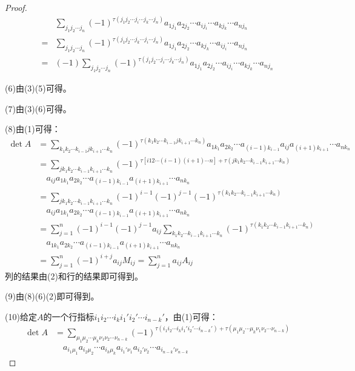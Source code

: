 \begin{proof}
\begin{align*}
		&\sum_{j_1j_2\cdots j_n}(-1)^{\tau(j_1j_2\cdots j_i\cdots j_k\cdots j_n)}a_{1j_1}a_{2j_2}\cdots a_{ij_i}\cdots a_{kj_k}\cdots a_{nj_n} \\
		=&\sum_{j_1j_2\cdots j_n}(-1)^{\tau(j_1j_2\cdots j_k\cdots j_i\cdots j_n)}a_{1j_1}a_{2j_2}\cdots a_{kj_k}\cdots a_{ij_i}\cdots a_{nj_n} \\
		=&(-1)\sum_{j_1j_2\cdots j_n}(-1)^{\tau(j_1j_2\cdots j_i\cdots j_k\cdots j_n)}a_{1j_1}a_{2j_2}\cdots a_{ij_i}\cdots a_{kj_k}\cdots a_{nj_n}
	\end{align*}\par
	(6)由(3)(5)可得。\par
	(7)由(3)(6)可得。\par
	(8)由(1)可得：
	\begin{align*}
		\det A&=\sum_{k_1k_2\cdots k_{i-1}jk_{i+1}\cdots k_n}(-1)^{\tau(k_1k_2\cdots k_{i-1}jk_{i+1}\cdots k_n)}a_{1k_1}a_{2k_2}\cdots a_{(i-1)k_{i-1}}a_{ij}a_{(i+1)k_{i+1}}\cdots a_{nk_n} \\
		&=\sum_{jk_1k_2\cdots k_{i-1}k_{i+1}\cdots k_n}(-1)^{\tau[i12\cdots(i-1)(i+1)\cdots n]+\tau(jk_1k_2\cdots k_{i-1}k_{i+1}\cdots k_n)} \\
		&\quad a_{ij}a_{1k_1}a_{2k_2}\cdots a_{(i-1)k_{i-1}}a_{(i+1)k_{i+1}}\cdots a_{nk_n} \\
		&=\sum_{jk_1k_2\cdots k_{i-1}k_{i+1}\cdots k_n}(-1)^{i-1}(-1)^{j-1}(-1)^{\tau(k_1k_2\cdots k_{i-1}k_{i+1}\cdots k_n)} \\
		&\quad a_{ij}a_{1k_1}a_{2k_2}\cdots a_{(i-1)k_{i-1}}a_{(i+1)k_{i+1}}\cdots a_{nk_n} \\
		&=\sum_{j=1}^{n}(-1)^{i-1}(-1)^{j-1}a_{ij}\sum_{k_1k_2\cdots k_{i-1}k_{i+1}\cdots k_n}(-1)^{\tau(k_1k_2\cdots k_{i-1}k_{i+1}\cdots k_n)} \\
		&\quad a_{1k_1}a_{2k_2}\cdots a_{(i-1)k_{i-1}}a_{(i+1)k_{i+1}}\cdots a_{nk_n} \\
		&=\sum_{j=1}^{n}(-1)^{i+j}a_{ij}M_{ij}=\sum_{j=1}^{n}a_{ij}A_{ij}
	\end{align*}
	列的结果由(2)和行的结果即可得到。\par
	(9)由(8)(6)(2)即可得到。\par
	(10)给定$A$的一个行指标$i_1i_2\cdots i_ki_1'i_2'\cdots i_{n-k}'$，由(1)可得：
	\begin{align*}
		\det A&=\sum_{\mu_1\mu_2\cdots\mu_k\nu_1\nu_2\cdots\nu_{n-k}}(-1)^{\tau(i_1i_2\cdots i_ki_1'i_2'\cdots i_{n-k}')+\tau(\mu_1\mu_2\cdots\mu_k\nu_1\nu_2\cdots\nu_{n-k})} \\
		&\quad a_{i_1\mu_1}a_{i_2\mu_2}\cdots a_{i_k\mu_k}a_{i_1'\nu_1}a_{i_2'\nu_2}\cdots a_{i_{n-k}'\nu_{n-k}}

\end{align*}
\end{proof}
